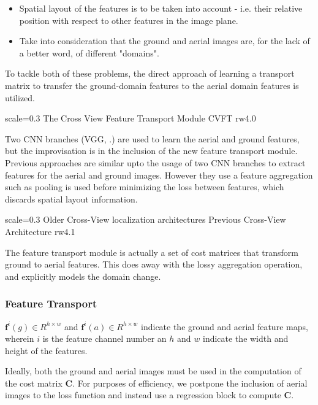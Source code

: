 \begin{itemize}
	\item Spatial layout of the features is to be taken into account - i.e. their relative position with respect to other features in the image plane. 
	
	\item Take into consideration that the ground and aerial images are, for the lack of a better word, of different "domains". 
\end{itemize}

To tackle both of these problems, the direct approach of learning a transport matrix to transfer the ground-domain features to the aerial domain features is utilized. 

{scale=0.3}%
{The Cross View Feature Transport Module}%
{CVFT}%
{rw4.0} %

Two CNN branches (VGG, \cite{Simonyan2015}.) are used to learn the aerial and ground features, but the improvisation is in the inclusion of the new feature transport module. Previous approaches are similar upto the usage of two CNN branches to extract features for the aerial and ground images. However they use a feature aggregation such as pooling is used before minimizing the loss between features, which discards spatial layout information.

{scale=0.3}%
{Older Cross-View localization architectures}%
{Previous Cross-View Architecture}%
{rw4.1} %

The feature transport module is actually a set of cost matrices that transform ground to aerial features. This does away with the lossy aggregation operation, and explicitly models the domain change.

\subsubsection{Feature Transport}
$\mathbf{f}^i(g) \in R^{h \times w}$ and $\mathbf{f}^i(a) \in R^{h \times w}$ indicate the ground and aerial feature maps, wherein $i$ is the feature channel number an $h$ and $w$ indicate the width and height of the features.

Ideally, both the ground and aerial images must be used in the computation of the cost matrix $\mathbf{C}$. For purposes of efficiency, we postpone the inclusion of aerial images to the loss function and instead use a regression block to compute $\mathbf{C}$.

